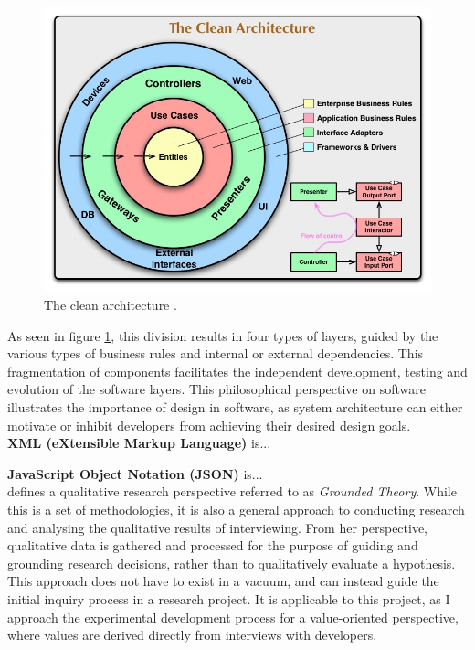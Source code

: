 \documentclass[../report.tex]{subfiles}
\begin{document}
\begin{figure}[H]
\centering
\includegraphics[width=0.9\linewidth]{figures/cleanarchitecture.jpg}
\caption{The clean architecture \cite[p. 196]{martin2018clean}.}
\label{fig:cleanarchitecture}
\end{figure}

As seen in figure \ref{fig:cleanarchitecture}, this division results in four types of layers, guided by the various types of business rules and internal or external dependencies. This fragmentation of components facilitates the independent development, testing and evolution of the software layers. This philosophical perspective on software illustrates the importance of design in software, as system architecture can either motivate or inhibit developers from achieving their desired design goals. \\


\textbf{XML (eXtensible Markup Language)} is...

\textbf{JavaScript Object Notation (JSON)} is... \\


\cite{charmaz2006constructing} defines a qualitative research perspective referred to as \textit{Grounded Theory}. While this is a set of methodologies, it is also a general approach to conducting research and analysing the qualitative results of interviewing. From her perspective, qualitative data is gathered and processed for the purpose of guiding and grounding research decisions, rather than to qualitatively evaluate a hypothesis. This approach does not have to exist in a vacuum, and can instead guide the initial inquiry process in a research project. It is applicable to this project, as I approach the experimental development process for a value-oriented perspective, where values are derived directly from interviews with developers.
\end{document}
